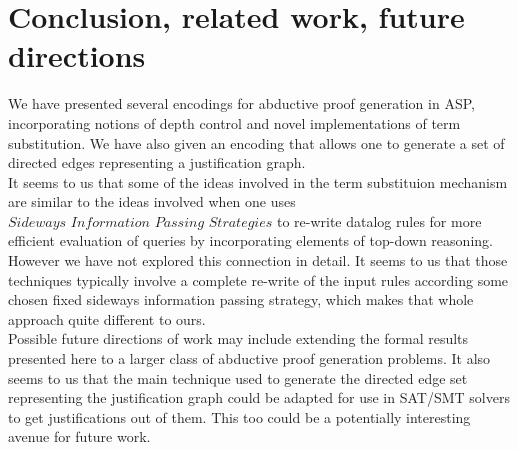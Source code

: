 \section{ Conclusion, related work, future directions}\label{sec:conclusion}
We have presented several encodings for abductive proof generation in ASP, incorporating notions of depth control and  novel implementations of term substitution. We have also given an encoding that allows one to generate a set of directed edges representing a justification graph.\\It seems to us that some of the ideas involved in the term substituion mechanism are similar to the ideas involved when one uses $\textit{Sideways Information Passing Strategies}$ \cite{beeri91} to re-write datalog rules for more efficient evaluation of queries by incorporating elements of top-down reasoning. However we have not explored this connection in detail. It seems to us that those techniques typically involve a complete re-write of the input rules according some chosen fixed sideways information passing strategy, which makes that whole approach quite different to ours.\\ Possible future directions of work may include extending the formal results presented here to a larger class of abductive proof generation problems. It also seems to us that the main technique used to generate the directed edge set representing the justification graph could be adapted for use in SAT/SMT solvers to get justifications out of them. This too could be a potentially interesting avenue for future work. 





